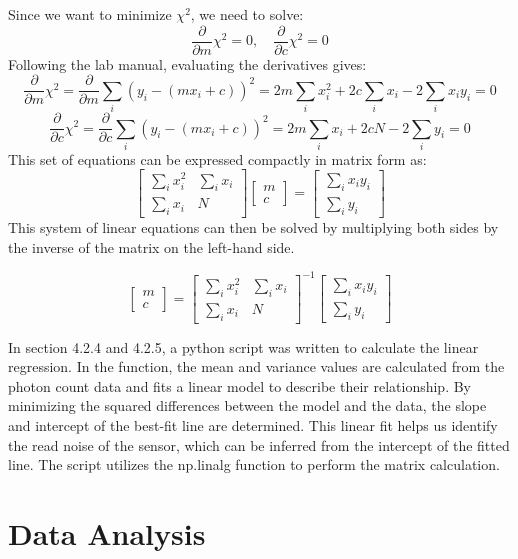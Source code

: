\documentclass[10pt, preprint]{aastex}
\begin{document}
Since we want to minimize $\chi^2$, we need to solve:
\[
\frac{\partial}{\partial m} \chi^2 = 0, \quad \frac{\partial}{\partial c} \chi^2 = 0
\]
Following the lab manual, evaluating the derivatives gives:
\[
\frac{\partial}{\partial m} \chi^2 = \frac{\partial}{\partial m} \sum_{i} \left( y_i - (mx_i + c) \right)^2 = 2m \sum_{i} x_i^2 + 2c \sum_{i} x_i - 2 \sum_{i} x_i y_i = 0
\]
\[
\frac{\partial}{\partial c} \chi^2 = \frac{\partial}{\partial c} \sum_{i} \left( y_i - (mx_i + c) \right)^2 = 2m \sum_{i} x_i + 2c N - 2 \sum_{i} y_i = 0
\]
This set of equations can be expressed compactly in matrix form as:
\[
\begin{bmatrix}
\sum_{i} x_i^2 & \sum_{i} x_i \\
\sum_{i} x_i & N
\end{bmatrix}
\begin{bmatrix}
m \\
c
\end{bmatrix}
=
\begin{bmatrix}
\sum_{i} x_i y_i \\
\sum_{i} y_i
\end{bmatrix}
\]
This system of linear equations can then be solved by multiplying both sides by the inverse of the matrix on the left-hand side.

\[
\begin{bmatrix}
m \\
c
\end{bmatrix}
=
\begin{bmatrix}
\sum_{i} x_i^2 & \sum_{i} x_i \\
\sum_{i} x_i & N
\end{bmatrix}^{-1}
\begin{bmatrix}
\sum_{i} x_i y_i \\
\sum_{i} y_i
\end{bmatrix}
\]

In section 4.2.4 and 4.2.5, a python script was written to calculate the linear regression. In the function, the mean and variance values are calculated from the photon count data and fits a linear model to describe their relationship. By minimizing the squared differences between the model and the data, the slope and intercept of the best-fit line are determined. This linear fit helps us identify the read noise of the sensor, which can be inferred from the intercept of the fitted line. The script utilizes the np.linalg function to perform the matrix calculation.

\section{Data Analysis}\label{sec:analysis}
\end{document}
